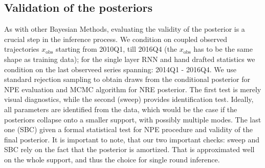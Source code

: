 \documentclass[12pt]{article}
\begin{document}
\subsection{Validation of the posteriors}
As with other Bayesian Methods, evaluating the validity of the posterior is a crucial step in the inference process. We condition on coupled observed trajectories $x_\text{obs}$ starting from 2010Q1, till 2016Q4 (the $x_\text{obs}$ has to be the same shape as training data); for the single layer RNN and hand drafted statistics we condition on the last observeed series spanning: 2014Q1 - 2016Q4. We use standard rejection sampling to obtain draws from the conditional posterior for NPE evaluation and MCMC algorithm for NRE posterior. The first test is merely visual diagnostics, while the second (sweep) provides identification test. Ideally, all parameters are identified from the data, which would be the case if the posteriors collapse onto a smaller support, with possibly multiple modes. The last one (SBC) given a formal statistical test for NPE procedure and validity of the final posterior. It is important to note, that our two important checks: sweep and SBC rely on the fact that the posterior is amortized. That is approximated well on the whole support, and thus the choice for single round inference.
\end{document}
